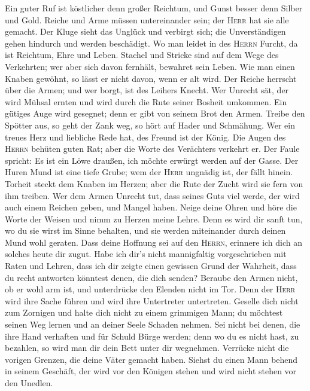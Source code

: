  Ein guter Ruf ist köstlicher denn großer Reichtum, und
Gunst besser denn Silber und Gold.  Reiche und Arme müssen
untereinander sein; der \textsc{Herr} hat sie alle gemacht.
 Der Kluge sieht das Unglück und verbirgt sich; die
Unverständigen gehen hindurch und werden beschädigt.  Wo
man leidet in des \textsc{Herrn} Furcht, da ist Reichtum, Ehre und
Leben.  Stachel und Stricke sind auf dem Wege des
Verkehrten; wer aber sich davon fernhält, bewahret sein Leben.
 Wie man einen Knaben gewöhnt, so lässt er nicht davon,
wenn er alt wird.  Der Reiche herrscht über die Armen; und
wer borgt, ist des Leihers Knecht.  Wer Unrecht sät, der
wird Mühsal ernten und wird durch die Rute seiner Bosheit umkommen.
 Ein gütiges Auge wird gesegnet; denn er gibt von seinem
Brot den Armen.  Treibe den Spötter aus, so geht der Zank
weg, so hört auf Hader und Schmähung.  Wer ein treues
Herz und liebliche Rede hat, des Freund ist der König. 
Die Augen des \textsc{Herrn} behüten guten Rat; aber die Worte des
Verächters verkehrt er.  Der Faule spricht: Es ist ein
Löwe draußen, ich möchte erwürgt werden auf der Gasse. 
Der Huren Mund ist eine tiefe Grube; wem der \textsc{Herr} ungnädig ist,
der fällt hinein.  Torheit steckt dem Knaben im Herzen;
aber die Rute der Zucht wird sie fern von ihm treiben. 
Wer dem Armen Unrecht tut, dass seines Guts viel werde, der wird auch
einem Reichen geben, und Mangel haben.  Neige deine Ohren
und höre die Worte der Weisen und nimm zu Herzen meine Lehre.
 Denn es wird dir sanft tun, wo du sie wirst im Sinne
behalten, und sie werden miteinander durch deinen Mund wohl geraten.
 Dass deine Hoffnung sei auf den \textsc{Herrn}, erinnere
ich dich an solches heute dir zugut.  Habe ich dir's
nicht mannigfaltig vorgeschrieben mit Raten und Lehren, 
dass ich dir zeigte einen gewissen Grund der Wahrheit, dass du recht
antworten könntest denen, die dich senden?  Beraube den
Armen nicht, ob er wohl arm ist, und unterdrücke den Elenden nicht im
Tor.  Denn der \textsc{Herr} wird ihre Sache führen und
wird ihre Untertreter untertreten.  Geselle dich nicht
zum Zornigen und halte dich nicht zu einem grimmigen Mann;
 du möchtest seinen Weg lernen und an deiner Seele
Schaden nehmen.  Sei nicht bei denen, die ihre Hand
verhaften und für Schuld Bürge werden;  denn wo du es
nicht hast, zu bezahlen, so wird man dir dein Bett unter dir wegnehmen.
 Verrücke nicht die vorigen Grenzen, die deine Väter
gemacht haben.  Siehst du einen Mann behend in seinem
Geschäft, der wird vor den Königen stehen und wird nicht stehen vor den
Unedlen.

